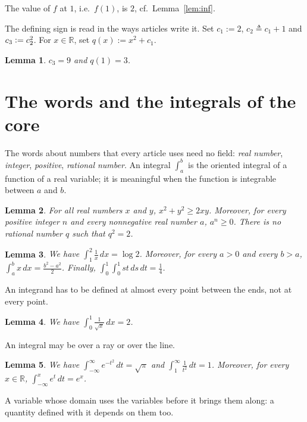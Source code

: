 \documentclass{article}
\newtheorem{lemma}{Lemma}
\begin{document}
The value of $f$ at $1$, i.e.\ $f(1)$, is $2$, cf.\ Lemma~\ref{lem:inf}.

The defining sign is read in the ways articles write it.
Set $c_1:=2$, $c_2\triangleq c_1+1$ and $c_3\vcentcolon=c_2^2$.
For $x\in\mathbb{R}$, set $q(x)\mathrel{:=}x^2+c_1$.

\begin{lemma}\label{lem:defining-signs}
$c_3=9$ and $q(1)=3$.
\end{lemma}

\section{The words and the integrals of the core}

The words about numbers that every article uses need no field: \emph{real number}, \emph{integer}, \emph{positive}, \emph{rational number}.
An integral $\int_a^b$ is the oriented integral of a function of a real variable; it is meaningful when the function is integrable between $a$ and $b$.

\begin{lemma}\label{lem:core-words}
For all real numbers $x$ and $y$, $x^2+y^2\ge2xy$.
Moreover, for every positive integer $n$ and every nonnegative real number $a$, $a^n\ge0$.
There is no rational number $q$ such that $q^2=2$.
\end{lemma}

\begin{lemma}\label{lem:integrals}
We have $\int_1^2\frac1x\,dx=\log 2$.
Moreover, for every $a>0$ and every $b>a$, $\int_a^b x\,dx=\frac{b^2-a^2}{2}$.
Finally, $\int_0^1\int_0^1 st\,ds\,dt=\frac14$.
\end{lemma}

An integrand has to be defined at almost every point between the ends, not at every point.

\begin{lemma}\label{lem:integral-ae}
We have $\int_0^1\frac{1}{\sqrt x}\,dx=2$.
\end{lemma}

An integral may be over a ray or over the line.

\begin{lemma}\label{lem:integral-improper}
We have $\int_{-\infty}^\infty e^{-t^2}\,dt=\sqrt\pi$ and $\int_1^\infty\frac1{t^2}\,dt=1$.
Moreover, for every $x\in\mathbb{R}$, $\int_{-\infty}^x e^{t}\,dt=e^x$.
\end{lemma}

A variable whose domain uses the variables before it brings them along: a quantity defined with it depends on them too.
\end{document}
